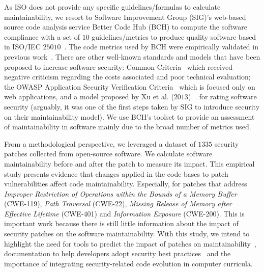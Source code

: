 \documentclass[10pt,conference]{IEEEtran}
\newcommand\Luis[1]{\nb{Luis}{mygreen}{#1}}
\begin{document}
As ISO does not provide any specific guidelines/formulas to calculate 
maintainability, we resort to Software Improvement Group (SIG)'s web-based source 
code analysis service Better Code Hub (BCH) to compute the software compliance 
with a set of $10$ guidelines/metrics to produce quality software 
based in ISO/IEC $25010$~\cite{Visser:2016:OREILLY}. The code metrics used by BCH 
were empirically validated in previous work~\cite{Bijlsma:2012:FIR:2317098.2317124, 8530041, cruz2019energyoriented}. 
There are other well-known standards and models that have been proposed
to increase software security: Common Criteria~\cite{common:2009} which received
negative criticism regarding the costs associated and poor technical evaluation;
the OWASP Application Security Verification Criteria~\cite{oswap:2009} which is
focused only on web applications, and a model proposed by Xu et al. ($2013$)
~\cite{6616351} for rating software security (arguably, it was one of the
first steps taken by SIG to introduce security on their maintainability model). 
%
We use BCH's toolset to provide an assessment of maintainability in 
software mainly due to the broad number of metrics used.

From a methodological 
perspective, we leveraged a dataset of $1335$ security patches collected from open-source 
software. We calculate software maintainability before and after the patch to measure its 
impact. This empirical study presents evidence that changes 
applied in the code bases to patch vulnerabilities affect code maintainability. Especially, 
for patches that address \emph{Improper Restriction of Operations within the Bounds of 
a Memory Buffer} (CWE-119), \emph{Path Traversal} (CWE-22), \emph{Missing Release of Memory 
after Effective Lifetime} (CWE-401) and \emph{Information Exposure} (CWE-200)\Luis{Little information is known about..}.
This is important work
because there is still little information about the impact of security patches on the software
maintainability. With this study, 
we intend to highlight the need for tools to predict the impact of patches on 
maintainability~\cite{4724577}, documentation to help developers adopt security 
best practices~\cite{6311252, 7927935, MESQUIDA201519} and the importance of integrating
security-related code evolution in computer curricula.
%
%
\end{document}
